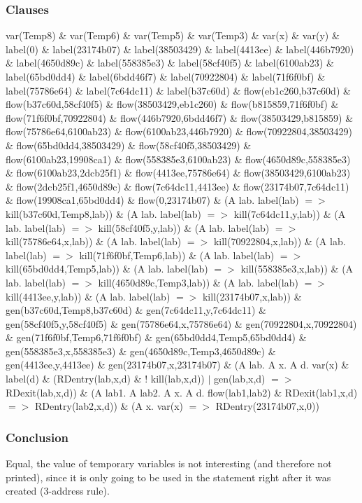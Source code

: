 \documentclass{report}
\begin{document}
\subsubsection{Clauses}
var(Temp8) \& var(Temp6) \& var(Temp5) \& var(Temp3) \& var(x) \& var(y) \& 
label(0) \& label(23174b07) \& label(38503429) \& label(4413ee) \& label(446b7920) \& label(4650d89c) \& label(558385e3) \& label(58cf40f5) \& label(6100ab23) \& label(65bd0dd4) \& label(6bdd46f7) \& label(70922804) \& label(71f6f0bf) \& label(75786e64) \& label(7c64dc11) \& label(b37c60d) \& 
flow(eb1c260,b37c60d) \& flow(b37c60d,58cf40f5) \& flow(38503429,eb1c260) \& flow(b815859,71f6f0bf) \& flow(71f6f0bf,70922804) \& flow(446b7920,6bdd46f7) \& flow(38503429,b815859) \& flow(75786e64,6100ab23) \& flow(6100ab23,446b7920) \& flow(70922804,38503429) \& flow(65bd0dd4,38503429) \& flow(58cf40f5,38503429) \& flow(6100ab23,19908ca1) \& flow(558385e3,6100ab23) \& flow(4650d89c,558385e3) \& flow(6100ab23,2dcb25f1) \& flow(4413ee,75786e64) \& flow(38503429,6100ab23) \& flow(2dcb25f1,4650d89c) \& flow(7c64dc11,4413ee) \& flow(23174b07,7c64dc11) \& flow(19908ca1,65bd0dd4) \& flow(0,23174b07) \& 
(A lab. label(lab) $=>$ kill(b37c60d,Temp8,lab)) \& (A lab. label(lab) $=>$ kill(7c64dc11,y,lab)) \& (A lab. label(lab) $=>$ kill(58cf40f5,y,lab)) \& (A lab. label(lab) $=>$ kill(75786e64,x,lab)) \& (A lab. label(lab) $=>$ kill(70922804,x,lab)) \& (A lab. label(lab) $=>$ kill(71f6f0bf,Temp6,lab)) \& (A lab. label(lab) $=>$ kill(65bd0dd4,Temp5,lab)) \& (A lab. label(lab) $=>$ kill(558385e3,x,lab)) \& (A lab. label(lab) $=>$ kill(4650d89c,Temp3,lab)) \& (A lab. label(lab) $=>$ kill(4413ee,y,lab)) \& (A lab. label(lab) $=>$ kill(23174b07,x,lab)) \& 
gen(b37c60d,Temp8,b37c60d) \& gen(7c64dc11,y,7c64dc11) \& gen(58cf40f5,y,58cf40f5) \& gen(75786e64,x,75786e64) \& gen(70922804,x,70922804) \& gen(71f6f0bf,Temp6,71f6f0bf) \& gen(65bd0dd4,Temp5,65bd0dd4) \& gen(558385e3,x,558385e3) \& gen(4650d89c,Temp3,4650d89c) \& gen(4413ee,y,4413ee) \& gen(23174b07,x,23174b07) \& 
(A lab. A x. A d. var(x) \& label(d) \& (RDentry(lab,x,d) \& ! kill(lab,x,d)) $|$ gen(lab,x,d) $=>$ RDexit(lab,x,d)) \& 
(A lab1. A lab2. A x. A d. flow(lab1,lab2) \& RDexit(lab1,x,d) $=>$ RDentry(lab2,x,d)) \& 
(A x. var(x) $=>$ RDentry(23174b07,x,0))
\subsubsection{Conclusion}
Equal, the value of temporary variables is not interesting (and therefore not printed), since it is only going to be used in the statement right after it was created (3-address rule).
\end{document}
